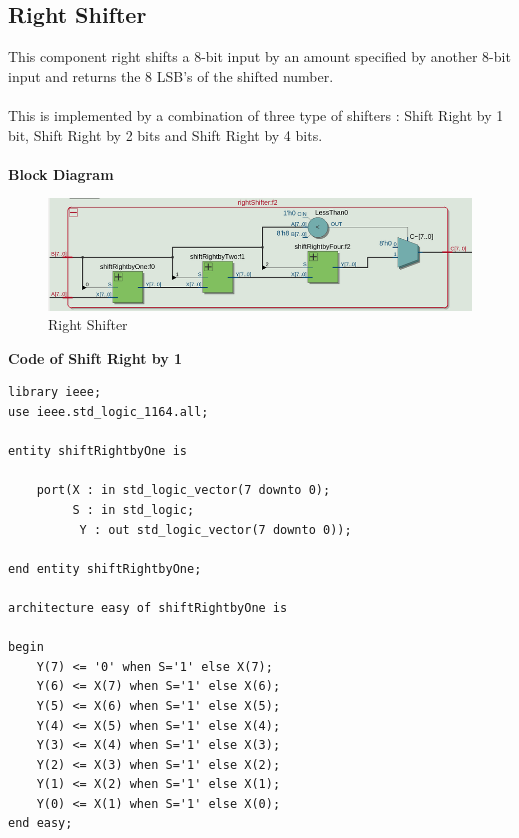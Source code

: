 \documentclass[12pt]{article}
\begin{document}
    \subsection{Right Shifter}
        This component right shifts a 8-bit input by an amount specified by another 8-bit input and returns the 8 LSB's of the shifted number.\\\\
        This is implemented by a combination of three type of shifters : Shift Right by 1 bit, Shift Right by 2 bits and Shift Right by 4 bits.\\\\
        \noindent
        \textbf{Block Diagram}
        \begin{figure}[H]
            \centering
            \includegraphics[width=0.6\linewidth]{rightShifter.png}
            \caption{Right Shifter}
            \label{fig:instru}
        \end{figure}
        
        \noindent
        \textbf{Code of Shift Right by 1}
        \noindent
        \begin{verbatim}
library ieee;
use ieee.std_logic_1164.all;

entity shiftRightbyOne is

	port(X : in std_logic_vector(7 downto 0);
		 S : in std_logic;
		  Y : out std_logic_vector(7 downto 0));
		  
end entity shiftRightbyOne;

architecture easy of shiftRightbyOne is

begin
	Y(7) <= '0' when S='1' else X(7);
	Y(6) <= X(7) when S='1' else X(6);
	Y(5) <= X(6) when S='1' else X(5);
	Y(4) <= X(5) when S='1' else X(4);
	Y(3) <= X(4) when S='1' else X(3);
	Y(2) <= X(3) when S='1' else X(2);
	Y(1) <= X(2) when S='1' else X(1);
	Y(0) <= X(1) when S='1' else X(0);
end easy;
        \end{verbatim}
        
\end{document}
